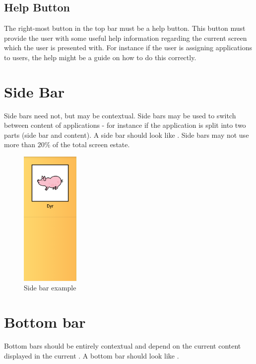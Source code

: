 \subsection{Help Button}
\label{sec:help_button}
The right-most button in the top bar must be a help button. This button must provide the user with some useful help information regarding the current screen which the user is presented with. For instance if the user is assigning applications to users, the help might be a guide on how to do this correctly.

\FloatBarrier


\section{Side Bar}

Side bars need not, but may be contextual. Side bars may be used to switch between content of applications - for instance if the application is split into two parts (side bar and content). A side bar should look like . Side bars may not use more than $20\%$ of the total screen estate.

\begin{figure}[!htbp]
        \centering
        \includegraphics[width=0.25\textwidth]{pictures/application_structure/sidebar}
        \caption{Side bar example}
        \label{fig:side_bar_example}
\end{figure}

\FloatBarrier


\section{Bottom bar}
Bottom bars should be entirely contextual and depend on the current content displayed in the current . A bottom bar should look like .


